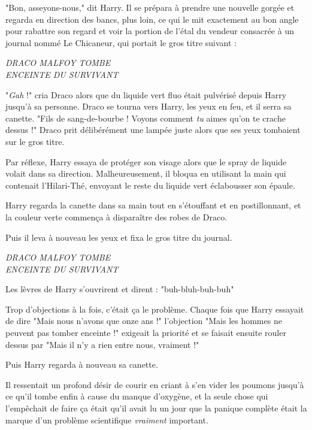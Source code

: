 "Bon, asseyons-nous," dit Harry. Il se prépara à prendre une nouvelle gorgée et regarda en direction des bancs, plus loin, ce qui le mit exactement au bon angle pour rabattre son regard et voir la portion de l'étal du vendeur consacrée à un journal nommé Le Chicaneur, qui portait le gros titre suivant :


\begin{center}\emph{DRACO MALFOY TOMBE} \\\emph{} \emph{ENCEINTE DU SURVIVANT} \end{center}


"\emph{Gah}  !" cria Draco alors que du liquide vert fluo était pulvérisé depuis Harry jusqu'à sa personne. Draco se tourna vers Harry, les yeux en feu, et il serra sa canette. "Fils de sang-de-bourbe ! Voyons comment \emph{tu}  aimes qu'on te crache dessus !" Draco prit délibérément une lampée juste alors que ses yeux tombaient sur le gros titre.

Par réflexe, Harry essaya de protéger son visage alors que le spray de liquide volait dans sa direction. Malheureusement, il bloqua en utilisant la main qui contenait l'Hilari-Thé, envoyant le reste du liquide vert éclabousser son épaule.

Harry regarda la canette dans sa main tout en s'étouffant et en postillonnant, et la couleur verte commença à disparaître des robes de Draco.

Puis il leva à nouveau les yeux et fixa le gros titre du journal.


\begin{center}\emph{DRACO MALFOY TOMBE} \\\emph{} \emph{ENCEINTE DU SURVIVANT} \end{center}


Les lèvres de Harry s'ouvrirent et dirent : "buh-bluh-buh-buh"

Trop d'objections à la fois, c'était ça le problème. Chaque fois que Harry essayait de dire "Mais nous n'avons que onze ans !" l'objection "Mais les hommes ne peuvent pas tomber enceinte !" exigeait la priorité et se faisait ensuite rouler dessus par "Mais il n'y a rien entre nous, vraiment !"

Puis Harry regarda à nouveau sa canette.

Il ressentait un profond désir de courir en criant à s'en vider les poumons jusqu'à ce qu'il tombe enfin à cause du manque d'oxygène, et la seule chose qui l'empêchait de faire ça était qu'il avait lu un jour que la panique complète était la marque d'un problème scientifique \emph{vraiment}  important.

